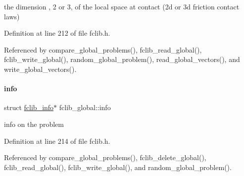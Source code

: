 the dimension , 2 or 3, of the local space at contact (2d or 3d friction contact laws) 



Definition at line 212 of file fclib.\+h.



Referenced by compare\+\_\+global\+\_\+problems(), fclib\+\_\+read\+\_\+global(), fclib\+\_\+write\+\_\+global(), random\+\_\+global\+\_\+problem(), read\+\_\+global\+\_\+vectors(), and write\+\_\+global\+\_\+vectors().

\mbox{\label{structfclib__global_aa6b4e80afc92dd1a9b260ff3a096b352}} 
\paragraph{\texorpdfstring{info}{info}}
{\footnotesize\ttfamily struct \mbox{\hyperlink{structfclib__info}{fclib\+\_\+info}}$\ast$ fclib\+\_\+global\+::info}



info on the problem 



Definition at line 214 of file fclib.\+h.



Referenced by compare\+\_\+global\+\_\+problems(), fclib\+\_\+delete\+\_\+global(), fclib\+\_\+read\+\_\+global(), fclib\+\_\+write\+\_\+global(), and random\+\_\+global\+\_\+problem().

